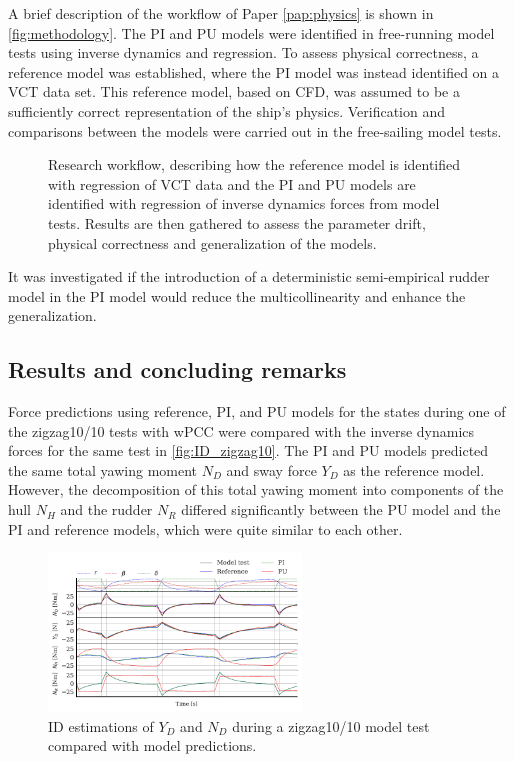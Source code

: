 A brief description of the workflow of Paper \ref{pap:physics} is shown in \autoref{fig:methodology}.
The PI and PU models were identified in free-running model tests using inverse dynamics and regression. To assess physical correctness, a reference model was established, where the PI model was instead identified on a VCT data set. This reference model, based on CFD, was assumed to be a sufficiently correct representation of the ship's physics.
Verification and comparisons between the models were carried out in the free-sailing model tests.
\begin{figure}[h]
  \centering
  
  \caption{Research workflow, describing how the reference model is identified with regression of VCT data and the PI and PU models are identified with regression of inverse dynamics forces from model tests. Results are then gathered to assess the parameter drift, physical correctness and generalization of the models.}
  \label{fig:methodology}
\end{figure}
It was investigated if the introduction of a deterministic semi-empirical rudder model in the PI model would reduce the multicollinearity and enhance the generalization.

\FloatBarrier
\subsection*{Results and concluding remarks}
Force predictions using reference, PI, and PU models for the states during one of the zigzag10/10 tests with wPCC were compared with the inverse dynamics forces for the same test in \autoref{fig:ID_zigzag10}. The PI and PU models predicted the same total yawing moment $N_D$ and sway force $Y_D$ as the reference model. However, the decomposition of this total yawing moment into components of the hull $N_H$ and the rudder $N_R$ differed significantly between the PU model and the PI and reference models, which were quite similar to each other.

\begin{figure}[h] \centering \includegraphics[width=0.6\textwidth]{kappa/images/results.ID_zigzag10.pdf} \caption{ID estimations of $Y_D$ and $N_D$ during a zigzag10/10 model test compared with model predictions.} \label{fig:ID_zigzag10} \end{figure}

